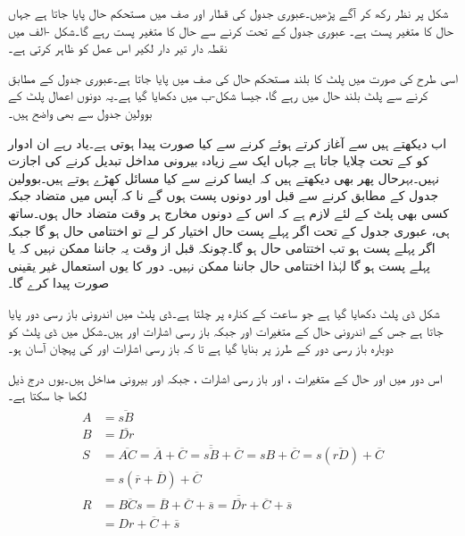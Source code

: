 شکل  پر نظر رکھ کر آگے پڑھیں۔عبوری جدول کی  قطار اور  صف میں مستحکم حال پایا جاتا ہے جہاں حال کا متغیر پست  ہے۔ عبوری جدول کے تحت  کرنے سے حال کا متغیر پست رہے گا۔شکل -الف میں نقطہ دار تیر دار لکیر اس عمل کو ظاہر کرتی ہے۔

اسی طرح  کی صورت میں پلٹ کا بلند مستحکم حال  کی صف میں پایا جاتا ہے۔عبوری جدول کے مطابق  کرنے سے پلٹ بلند حال میں رہے گا، جیسا شکل-ب میں دکھایا گیا ہے۔یہ دونوں اعمال پلٹ کے بوولین جدول سے بھی واضح ہیں۔

اب دیکھتے ہیں  سے آغاز کرتے ہوئے  کرنے سے کیا صورت پیدا ہوتی ہے۔یاد رہے ان ادوار کو کے تحت چلایا جاتا ہے جہاں ایک سے زیادہ بیرونی مداخل تبدیل کرنے کی اجازت نہیں۔بہرحال پھر بھی دیکھتے ہیں کہ ایسا کرنے سے کیا مسائل کھڑے ہوتے ہیں۔بوولین جدول کے مطابق کرنے سے قبل  اور  دونوں پست ہوں گے نا کہ آپس میں متضاد جبکہ کسی بھی پلٹ کے لئے لازم ہے کہ اس کے دونوں مخارج ہر وقت متضاد حال ہوں۔ساتھ ہی، عبوری جدول کے تحت اگر پہلے پست حال اختیار کر لے تو اختتامی حال  ہو گا جبکہ اگر  پہلے پست ہو تب اختتامی حال  ہو گا۔چونکہ قبل از وقت یہ جاننا ممکن نہیں کہ  یا  پہلے پست ہو گا لہٰذا اختتامی حال جاننا ممکن نہیں۔ دور کا یوں استعمال غیر یقینی صورت پیدا کرے گا۔


شکل  ڈی پلٹ دکھایا گیا ہے جو ساعت کے کنارہ پر چلتا ہے۔ڈی پلٹ میں اندرونی باز رسی دور پایا جاتا ہے جس کے اندرونی حال کے متغیرات  اور  جبکہ باز رسی اشارات  اور  ہیں۔شکل میں ڈی پلٹ کو دوبارہ باز رسی دور کے طرز پر بنایا گیا ہے تا کہ باز رسی اشارات  اور  کی پہچان آسان ہو۔

اس دور میں  اور  حال کے متغیرات ،  اور  باز رسی اشارات ، جبکہ  اور  بیرونی مداخل ہیں۔یوں درج ذیل لکھا جا سکتا ہے۔
\begin{gather}
\begin{aligned}
A&=\overline{sB}\\
B&=\overline{Dr}\\
S&=\overline{AC}=\overline{A}+\overline{C}=\overline{\overline{sB}}+\overline{C}=sB+\overline{C}=s(\overline{rD})+\overline{C}\\
&=s(\overline{r}+\overline{D})+\overline{C}\\
R&=\overline{BCs}=\overline{B}+\overline{C}+\overline{s}=\overline{\overline{Dr}}+\overline{C}+\overline{s}\\
&=Dr+\overline{C}+\overline{s}
\end{aligned}
\end{gather}

